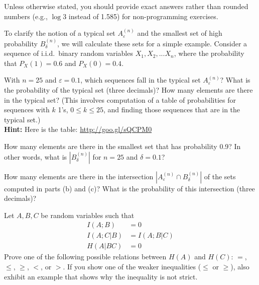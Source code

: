 \documentclass[a4paper,10pt,landscape,twocolumn]{scrartcl}
\begin{document}
\homeworkproblems

{\sffamily\noindent
Unless otherwise stated, you should provide exact answers rather than rounded numbers (e.g., $\log 3$ instead of 1.585) for non-programming exercises.
}

\newcommand{\typsetA}{A^{(n)}_{\varepsilon}}
\newcommand{\typsetB}{B^{(n)}_{\delta}}

\begin{exercise}
To clarify the notion of a typical set $\typsetA$ and the smallest set of high probability $\typsetB$, we will calculate these sets for a simple example. Consider a sequence of i.i.d.\ binary random variables $X_1, X_2, . . . X_n$, where the probability that $P_X(1) = 0.6$ and $P_X(0) = 0.4$.
	\begin{subex}[(3pt)]
	With $n = 25$ and $\varepsilon = 0.1$, which sequences fall in the typical set $\typsetA$? What is the probability of the typical set (three decimals)? How many elements are there in the typical set? (This involves computation of a table of probabilities for sequences with $k$ 1's, $0 \leq k \leq 25$, and finding those sequences that are in the typical set.)
\\\textbf{Hint:} Here is the table: \url{http://goo.gl/sQCPM0}
	\end{subex}
	\begin{subex}[(2pt)]
	How many elements are there in the smallest set that has probability 0.9? In other words, what is $|\typsetB|$ for $n = 25$ and $\delta = 0.1$?
	\end{subex}
	\begin{subex}[(2pt)]
	How many elements are there in the intersection $|\typsetA \cap \typsetB|$ of the sets computed in parts (b) and (c)? What is the probability of this intersection (three decimals)?
	\end{subex}
\end{exercise}

\begin{exercise}
Let $A,B,C$ be random variables such that
\begin{align*}
I(A;B) &= 0\\
I(A;C|B) &= I(A;B|C)\\
H(A|BC) &= 0
\end{align*}
Prove one of the following possible relations between $H(A)$ and $H(C)$: $=$, $\leq$, $\geq$, $<$, or $>$. If you show one of the weaker inequalities ($\leq$ or $\geq$), also exhibit an example that shows why the inequality is not strict.
\end{exercise}
\end{document}
